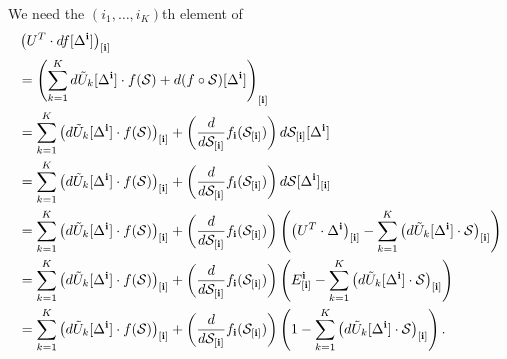 We need the $(i_1,\ldots,i_K)$th element of 
\begin{align}
&\left(U^T \cdot df[\Delta^{\bf i}]\right)_{[\mathbf{i}]} \nonumber\\
&= \left(\sum_{k=1}^Kd\tilde{U}_k[\Delta^{\bf i}] \cdot f(\mathcal{S}) + d(f \circ \mathcal{S})[\Delta^{\bf i}]\right)_{[\mathbf{i}]}\nonumber\\
&= \sum_{k=1}^K\left(d\tilde{U}_k[\Delta^{\bf i}] \cdot f(\mathcal{S})\right)_{[\mathbf{i}]} + \left(\frac{d}{d\mathcal{S}_{[\mathbf{i}]}}f_{\mathbf{i}}(\mathcal{S}_{[\mathbf{i}]})\right) d\mathcal{S}_{[\mathbf{i}]}[\Delta^{\bf i}]\nonumber\\
&= \sum_{k=1}^K\left(d\tilde{U}_k[\Delta^{\bf i}] \cdot f(\mathcal{S})\right)_{[\mathbf{i}]} + \left(\frac{d}{d\mathcal{S}_{[\mathbf{i}]}}f_{\mathbf{i}}(\mathcal{S}_{[\mathbf{i}]})\right) d\mathcal{S}[\Delta^{\bf i}]_{[\mathbf{i}]}\nonumber\\
&= \sum_{k=1}^K\left(d\tilde{U}_k[\Delta^{\bf i}] \cdot f(\mathcal{S})\right)_{[\mathbf{i}]} + \left(\frac{d}{d\mathcal{S}_{[\mathbf{i}]}}f_{\mathbf{i}}(\mathcal{S}_{[\mathbf{i}]})\right) \left(\left(U^T \cdot \Delta^{\bf i}\right)_{[\mathbf{i}]} - \sum_{k=1}^K \left(d\tilde{U}_k[\Delta^{\bf i}]\cdot \mathcal{S}\right)_{[\mathbf{i}]} \right) \nonumber\\
&= \sum_{k=1}^K\left(d\tilde{U}_k[\Delta^{\bf i}] \cdot f(\mathcal{S})\right)_{[\mathbf{i}]} + \left(\frac{d}{d\mathcal{S}_{[\mathbf{i}]}}f_{\mathbf{i}}(\mathcal{S}_{[\mathbf{i}]})\right) \left(E^{\bf i}_{[\mathbf{i}]} - \sum_{k=1}^K \left(d\tilde{U}_k[\Delta^{\bf i}]\cdot \mathcal{S}\right)_{[\mathbf{i}]} \right) \nonumber\\
&= \sum_{k=1}^K\left(d\tilde{U}_k[\Delta^{\bf i}] \cdot f(\mathcal{S})\right)_{[\mathbf{i}]} + \left(\frac{d}{d\mathcal{S}_{[\mathbf{i}]}}f_{\mathbf{i}}(\mathcal{S}_{[\mathbf{i}]})\right) \left(1 - \sum_{k=1}^K \left(d\tilde{U}_k[\Delta^{\bf i}]\cdot \mathcal{S}\right)_{[\mathbf{i}]} \right).  \label{equation:final.of.right.simp}
\end{align}


